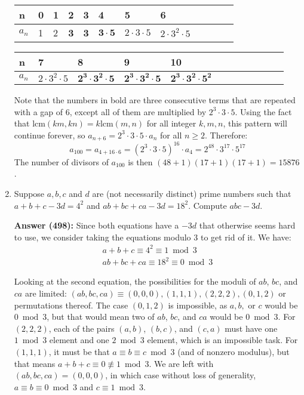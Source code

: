 \documentclass{article}
\begin{document}
\begin{enumerate}
\begin{table}[h!]
\centering
\begin{tabular}{|l|l|l|l|l|l|l|l|l|l|l|l|}
\hline
n  & 0 & 1 & \textbf{2} & \textbf{3} & \textbf{4} & 5 & 6  \\ \hline
$a_n$ & 1 & 2 & \textbf{3} & \textbf{3} & $\mathbf{3 \cdot 5}$ & $2 \cdot 3 \cdot 5$ & $2 \cdot 3^2 \cdot 5$ \\ \hline
\end{tabular}

\begin{tabular}{|l|l|l|l|l|l|l|l|l|l|l|l|}
\hline
n  & 7 & \textbf{8} & \textbf{9} & \textbf{10} \\ \hline
$a_n$ & $2 \cdot 3^2 \cdot 5$ & $\mathbf{2^3 \cdot 3^2 \cdot 5}$ & $\mathbf{2^3 \cdot 3^2 \cdot 5}$ & $\mathbf{2^3 \cdot 3^2 \cdot 5^2}$ \\ \hline
\end{tabular}
\end{table}

Note that the numbers in bold are three consecutive terms that are repeated with a gap of 6, except all of them are multiplied by $2^3 \cdot 3 \cdot 5$. Using the fact that $\mathrm{lcm}(km, kn) = k\mathrm{lcm}(m,n)$ for all integer $k,m,n$, this pattern will continue forever, so $a_{n+6} = 2^3 \cdot 3 \cdot 5 \cdot a_n$ for all $n \ge 2$. Therefore: \[ a_{100} = a_{4 + 16 \cdot 6} = (2^3 \cdot 3 \cdot 5)^{16} \cdot a_4 = 2^{48} \cdot 3^{17} \cdot 5^{17} \] The number of divisors of $a_{100}$ is then $(48+1)(17+1)(17+1) = 15\boxed{876}$.

\newpage

\item Suppose $a,b,c$ and $d$ are (not necessarily distinct) prime numbers such that $a+b+c-3d=4^2$ and $ab+bc+ca-3d=18^2$. Compute $abc-3d$.

\textbf{Answer (498):} Since both equations have a $-3d$ that otherwise seems hard to use, we consider taking the equations modulo 3 to get rid of it. We have: \begin{align*}
    a+b+c \equiv 4^2 \equiv 1 \bmod 3 \\
    ab+bc+ca \equiv 18^2 \equiv 0 \bmod 3 
\end{align*}

Looking at the second equation, the possibilities for the moduli of $ab$, $bc$, and $ca$ are limited: $(ab,bc,ca) \equiv (0,0,0),(1,1,1),(2,2,2),(0,1,2)$ or permutations thereof. The case $(0,1,2)$ is impossible, as $a,b,$ or $c$ would be $0 \bmod 3$, but that would mean two of $ab$, $bc$, and $ca$ would be $0 \bmod 3$. For $(2,2,2)$, each of the pairs $(a,b)$, $(b,c)$, and $(c,a)$ must have one $1 \bmod 3$ element and one $2 \bmod 3$ element, which is an impossible task. For $(1,1,1)$, it must be that $a \equiv b \equiv c \bmod 3$ (and of nonzero modulus), but that means $a+b+c \equiv 0 \not\equiv 1 \bmod 3$. We are left with $(ab,bc,ca)=(0,0,0)$, in which case without loss of generality, $a \equiv b \equiv 0 \bmod 3$ and $c \equiv 1 \bmod 3$.


\end{enumerate}
\end{document}
